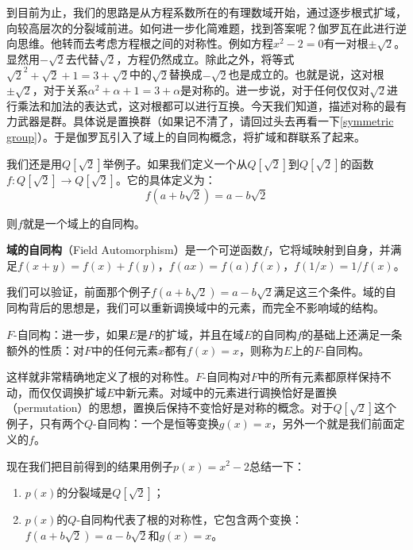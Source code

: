 \documentclass[b5paper]{ctexart}
\begin{document}
到目前为止，我们的思路是从方程系数所在的有理数域开始，通过逐步根式扩域，向较高层次的分裂域前进。如何进一步化简难题，找到答案呢？伽罗瓦在此进行逆向思维。他转而去考虑方程根之间的对称性。例如方程$x^2 - 2 = 0$有一对根$\pm \sqrt{2}$。显然用$-\sqrt{2}$去代替$\sqrt{2}$，方程仍然成立。除此之外，将等式$\sqrt{2}^2 + \sqrt{2} + 1 = 3 + \sqrt{2}$中的$\sqrt{2}$替换成$-\sqrt{2}$也是成立的。也就是说，这对根$\pm \sqrt{2}$，对于关系$\alpha^2 + \alpha + 1 = 3 + \alpha$是对称的。进一步说，对于任何仅仅对$\sqrt{2}$进行乘法和加法的表达式，这对根都可以进行互换。今天我们知道，描述对称的最有力武器是群。具体说是置换群（如果记不清了，请回过头去再看一下\ref{symmetric group}）。于是伽罗瓦引入了域上的自同构概念，将扩域和群联系了起来。

我们还是用$Q[\sqrt{2}]$举例子。如果我们定义一个从$Q[\sqrt{2}]$到$Q[\sqrt{2}]$的函数$f: Q[\sqrt{2}] \to Q[\sqrt{2}]$。它的具体定义为：
\[
f(a + b \sqrt{2}) = a - b \sqrt{2}
\]

则$f$就是一个域上的自同构。

\begin{definition}
\textbf{域的自同构}（Field Automorphism）是一个可逆函数$f$，它将域映射到自身，并满足$f(x + y) = f(x) + f(y)$，$f(ax) = f(a) f(x)$，$f(1/x) = 1/f(x)$。
\end{definition}

我们可以验证，前面那个例子$f(a + b \sqrt{2}) = a - b \sqrt{2}$满足这三个条件。域的自同构背后的思想是，我们可以重新调换域中的元素，而完全不影响域的结构。

\begin{definition}
$F$-自同构：进一步，如果$E$是$F$的扩域，并且在域$E$的自同构$f$的基础上还满足一条额外的性质：对$F$中的任何元素$x$都有$f(x) = x$，则称为$E$上的$F$-自同构。
\end{definition}

这样就非常精确地定义了根的对称性。$F$-自同构对$F$中的所有元素都原样保持不动，而仅仅调换扩域$E$中新元素。对域中的元素进行调换恰好是置换（permutation）的思想，置换后保持不变恰好是对称的概念。对于$Q[\sqrt{2}]$这个例子，只有两个$Q$-自同构：一个是恒等变换$g(x) = x$，另外一个就是我们前面定义的$f$。

现在我们把目前得到的结果用例子$p(x) = x^2 - 2$总结一下：

\begin{enumerate}
\item $p(x)$的分裂域是$Q[\sqrt{2}]$；
\item $p(x)$的$Q$-自同构代表了根的对称性，它包含两个变换：$f(a + b\sqrt{2}) = a - b\sqrt{2}$和$g(x) = x$。
\end{enumerate}
\end{document}

